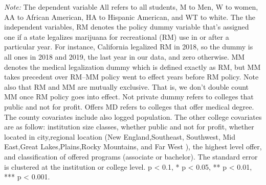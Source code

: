 \documentclass[12pt]{article}%
\begin{document}
\textit{Note:}  The dependent variable All refers to all students, M to Men, W to women, AA to African American, HA to Hispanic American, and WT to white. The the independent variables, RM denotes the policy dummy variable that's assigned one if a state legalizes marijuana for recreational (RM) use in or after a particular year. For instance, California legalized RM in 2018, so the dummy is all ones in 2018 and 2019, the last year in our data, and zero otherwise. MM denotes the medical legalization dummy which is defined exactly as RM, but MM takes precedent over RM--MM policy went to effect years before RM policy. Note also that RM and MM are mutually exclusive. That is, we don't double count MM once RM policy goes into effect. Not private dummy refers to colleges that public and not for profit. Offers MD refers to colleges that offer medical degree. The county covariates include also logged population. The other college covariates are as follow: institution size classes, whether public and not for profit, whether located in city,regional location (New England,Southeast, Southwest, Mid East,Great Lakes,Plains,Rocky Mountains, and Far West ), the highest level offer, and  classification of offered programs (associate or bachelor). The standard error is clustered at the institution or college level. p \textless{} 0.1, * p \textless{} 0.05, ** p
\textless{} 0.01, *** p \textless{} 0.001.
\end{document}
